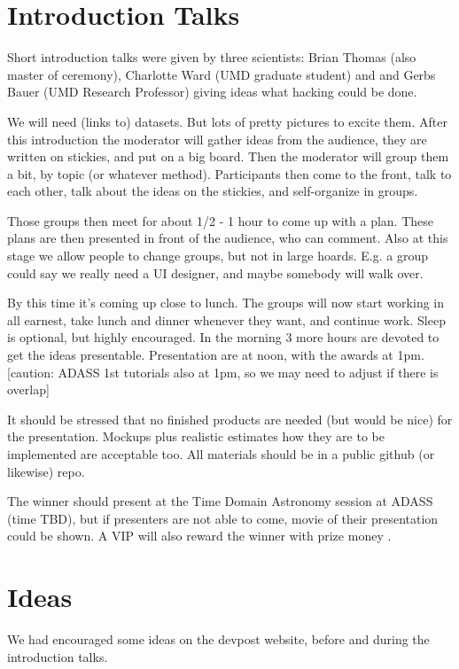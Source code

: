 \documentclass[11pt,twoside]{article}
\begin{document}
\section{Introduction Talks}

Short introduction talks were given by three scientists: Brian Thomas (also master of ceremony),
Charlotte Ward (UMD graduate student) and and Gerbs Bauer (UMD Research Professor)
giving ideas what hacking could be done. 


We will need (links to) datasets. But lots of pretty pictures to excite
them.  After this introduction the moderator will gather ideas
from the audience, they are written on stickies, and put on a big
board.  Then the moderator will group them a bit, by topic (or
whatever method).  Participants then come to the front, talk to each
other, talk about the ideas on the stickies, and self-organize in
groups.

Those groups then meet for about 1/2 - 1 hour to come up with a
plan. These plans are then presented in front of the audience, who can
comment.  Also at this stage we allow people to change groups, but not
in large hoards. E.g. a group could say we really need a UI designer,
and maybe somebody will walk over.

By this time it's coming up close to lunch. The groups will now start
working in all earnest, take lunch and dinner whenever they want, and
continue work. Sleep is optional, but highly encouraged. In the
morning 3 more hours are devoted to get the ideas presentable.
Presentation are at noon, with the awards at 1pm. [caution: ADASS 1st
  tutorials also at 1pm, so we may need to adjust if there is overlap]

It should be stressed that no finished products are needed (but would
be nice) for the presentation. Mockups plus realistic estimates how
they are to be implemented are acceptable too. All materials should
be in a public github (or likewise) repo.

The winner should present at the Time Domain Astronomy session at
ADASS (time TBD), but if presenters are not able to come, movie of
their presentation could be shown.  A VIP will also reward the winner
with prize money .

\section{Ideas}

We had encouraged some ideas on the devpost website, before and during the
introduction talks.
\end{document}

